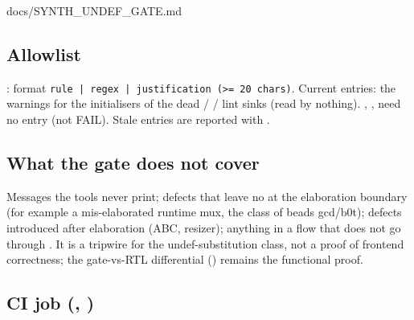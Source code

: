 \begin{relocated}{docs/SYNTH_UNDEF_GATE.md}
\subsection{Allowlist}\label{tm:flow:synth-undef-gate:allowlist}

: format
\texttt{rule\ |\ regex\ |\ justification\ (>=\allowbreak{}\ 20\ chars)}.
Current entries: the  warnings for the initialisers
of the dead  /  /
 lint sinks (read by nothing). ,
,  need no entry (not FAIL). Stale
entries are reported with .

\subsection{What the gate does not cover}\label{tm:flow:synth-undef-gate:what-the-gate-does-not-cover}

Messages the tools never print; defects that leave no  at the
elaboration boundary (for example a mis-elaborated runtime mux, the
 class of beads gcd/b0t); defects introduced after
elaboration (ABC, resizer); anything in a flow that does not go through
. It is a tripwire for the undef-substitution class,
not a proof of frontend correctness; the gate-vs-RTL differential
() remains the functional proof.

\subsection{\texorpdfstring{CI job
(,
)}{CI job (, )}}\label{tm:flow:synth-undef-gate:ci-job-githubworkflowssynth-undef-gateyml-toolsverifsynth-gateci-smokesh}


\end{relocated}
